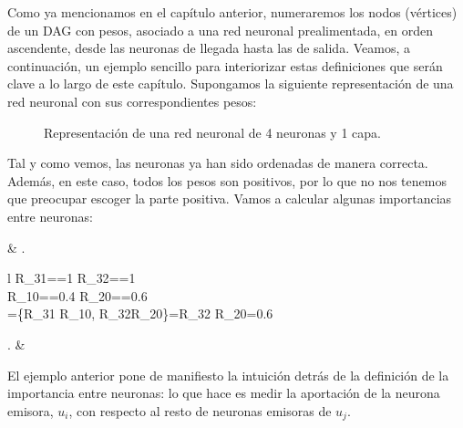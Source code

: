 \documentclass[12pt, a4paper, twoside]{book}
\numberwithin{equation}{section}
\theoremstyle{definition}
\newenvironment{ejem}
  {\pushQED{\qed}\renewcommand{\qedsymbol}{$\blacktriangleleft$}\ejemplo}
  {\popQED\endejemplo}
\theoremstyle{remark}
\theoremstyle{plain}
\begin{document}
	Como ya mencionamos en el capítulo anterior, numeraremos los nodos 
	(vértices) de un DAG con pesos, asociado a una red neuronal 
	prealimentada, en orden ascendente, desde las neuronas de llegada 
	hasta las de salida. Veamos, a continuación, un ejemplo sencillo para 
	interiorizar estas definiciones que serán clave a lo largo de este 
	capítulo.
	\begin{ejem}
		\label{ej:primerRel}	
		Supongamos la siguiente representación de una red neuronal con sus correspondientes pesos: 	
		\begin{figure}[H]
			\centering
			\caption{Representación de una red neuronal de 4 neuronas y 1 capa.}
		\end{figure}
		
		Tal y como vemos, las neuronas ya han sido ordenadas de manera 
		correcta. Además, en este caso, todos los pesos son positivos, 
		por lo que no nos tenemos que preocupar escoger la parte 
		positiva. Vamos a calcular algunas importancias entre 
		neuronas:			
		\begin{flalign*}
			& \left.
				\begin{array}{l}
					R_{31}==1 \hspace{0.5cm} R_{32}==1 \\[3pt]
					R_{10}==0.4 \hspace{0.55cm}  R_{20}==0.6 \\[3pt]
					=\{R_{31} \cdot R_{10}, R_{32}\cdot R_{20}\}=R_{32} \cdot R_{20}=0.6  
				\end{array}
			\right. & 
		\end{flalign*}
	\end{ejem}
	El ejemplo anterior pone de manifiesto la intuición detrás de la 
	definición de la importancia entre neuronas: lo que hace es medir 
	la aportación de la neurona emisora, $u_{i}$, con respecto al resto de 
	neuronas emisoras de $u_{j}$.
	
\end{document}

